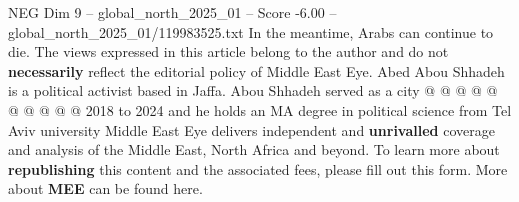 \begin{textsample}{NEG Dim 9 – global\_north\_2025\_01 – Score -6.00 – global\_north\_2025\_01/119983525.txt}
In the meantime, Arabs can continue to die.
The views expressed in this article belong to the author and do not \textbf{necessarily} reflect the editorial policy of Middle East Eye.
Abed Abou Shhadeh is a political activist based in Jaffa.
Abou Shhadeh served as a city @ @ @ @ @ @ @ @ @ @ 2018 to 2024 and he holds an MA degree in political science from Tel Aviv university Middle East Eye delivers independent and \textbf{unrivalled} coverage and analysis of the Middle East, North Africa and beyond.
To learn more about \textbf{republishing} this content and the associated fees, please fill out this form.
More about \textbf{MEE} can be found here.

\end{textsample}
